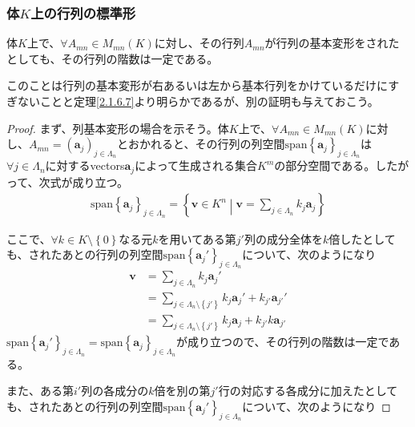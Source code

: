 \documentclass[dvipdfmx]{jsarticle}
\begin{document}
\subsubsection{体$K$上の行列の標準形}%
\begin{thm}\label{2.1.7.3}
体$K$上で、$\forall A_{mn} \in M_{mn}(K)$に対し、その行列$A_{mn}$が行列の基本変形をされたとしても、その行列の階数は一定である。\par
このことは行列の基本変形が右あるいは左から基本行列をかけているだけにすぎないことと定理\ref{2.1.6.7}より明らかであるが、別の証明も与えておこう。
\end{thm}
\begin{proof}
まず、列基本変形の場合を示そう。体$K$上で、$\forall A_{mn} \in M_{mn}(K)$に対し、$A_{mn} = \left( \mathbf{a}_{j} \right)_{j \in \varLambda_{n}}$とおかれると、その行列の列空間${\mathrm{span}}\left\{ \mathbf{a}_{j} \right\}_{j \in \varLambda_{n}}$は$\forall j \in \varLambda_{n}$に対するvectors$\mathbf{a}_{j}$によって生成される集合$K^{m}$の部分空間である。したがって、次式が成り立つ。
\begin{align*}
{\mathrm{span}}\left\{ \mathbf{a}_{j} \right\}_{j \in \varLambda_{n}} = \left\{ \mathbf{v} \in K^{n} \middle| \mathbf{v} = \sum_{j \in \varLambda_{n}} {k_{j}\mathbf{a}_{j}} \right\}
\end{align*}\par
ここで、$\forall k \in K \setminus \left\{ 0 \right\}$なる元$k$を用いてある第$j'$列の成分全体を$k$倍したとしても、されたあとの行列の列空間${\mathrm{span}}\left\{ \mathbf{a}_{j}' \right\}_{j \in \varLambda_{n}}$について、次のようになり
\begin{align*}
\mathbf{v} &= \sum_{j \in \varLambda_{n}} {k_{j}\mathbf{a}_{j}'}\\
&= \sum_{j \in \varLambda_{n} \setminus \left\{ j' \right\}} {k_{j}\mathbf{a}_{j}'} + k_{j'}\mathbf{a}_{j'}'\\
&= \sum_{j \in \varLambda_{n} \setminus \left\{ j' \right\}} {k_{j}\mathbf{a}_{j}} + k_{j'}k\mathbf{a}_{j'}
\end{align*}
${\mathrm{span}}\left\{ \mathbf{a}_{j}' \right\}_{j \in \varLambda_{n}} = {\mathrm{span}}\left\{ \mathbf{a}_{j} \right\}_{j \in \varLambda_{n}}$が成り立つので、その行列の階数は一定である。\par
また、ある第$i'$列の各成分の$k$倍を別の第$j'$行の対応する各成分に加えたとしても、されたあとの行列の列空間${\mathrm{span}}\left\{ \mathbf{a}_{j}' \right\}_{j \in \varLambda_{n}}$について、次のようになり

\end{proof}
\end{document}
